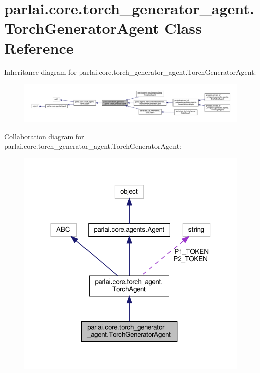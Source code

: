 \hypertarget{classparlai_1_1core_1_1torch__generator__agent_1_1TorchGeneratorAgent}{}\section{parlai.\+core.\+torch\+\_\+generator\+\_\+agent.\+Torch\+Generator\+Agent Class Reference}
\label{classparlai_1_1core_1_1torch__generator__agent_1_1TorchGeneratorAgent}


Inheritance diagram for parlai.\+core.\+torch\+\_\+generator\+\_\+agent.\+Torch\+Generator\+Agent\+:
\nopagebreak
\begin{figure}[H]
\begin{center}
\leavevmode
\includegraphics[width=350pt]{classparlai_1_1core_1_1torch__generator__agent_1_1TorchGeneratorAgent__inherit__graph}
\end{center}
\end{figure}


Collaboration diagram for parlai.\+core.\+torch\+\_\+generator\+\_\+agent.\+Torch\+Generator\+Agent\+:
\nopagebreak
\begin{figure}[H]
\begin{center}
\leavevmode
\includegraphics[width=318pt]{classparlai_1_1core_1_1torch__generator__agent_1_1TorchGeneratorAgent__coll__graph}
\end{center}
\end{figure}
